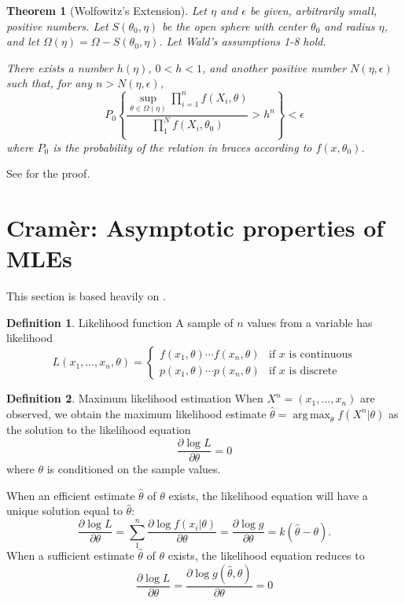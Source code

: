 \documentclass[letterpaper,11pt]{article}
\DeclareMathOperator*{\argmax}{arg\,max}
\newcounter{thm}
\newtheorem{theorem}[thm]{Theorem}
\theoremstyle{definition}
\newcounter{def}
\newtheorem*{defn}{Definition}
\begin{document}
\begin{theorem}[Wolfowitz's Extension]\label{wolf-thm}
Let $\eta$ and $\epsilon$ be given, arbitrarily small, positive numbers. Let $S(\theta_0,\eta)$ be the open sphere with center $\theta_0$ and radius $\eta$, and let $\Omega(\eta) = \Omega - S(\theta_0,\eta)$. Let Wald's assumptions 1-8 hold. 

There exists a number $h(\eta)$, $0<h<1$, and another positive number $N(\eta,\epsilon)$ such that, for any $n>N(\eta,\epsilon)$, $$P_0\left\{
\frac{\sup_{\theta\in\Omega(\eta)}\prod_{i=1}^n f(X_i,\theta)}
{\prod_{1}^N f(X_i,\theta_0)} > h^n
\right\}<\epsilon$$
where $P_0$ is the probability of the relation in braces according to $f(x,\theta_0)$.
\end{theorem}

See \citet{wolfowitzWaldProofConsistency1949} for the proof.

\section{Cram\`er: Asymptotic properties of MLEs}
This section is based heavily on \citet{cramerMathematicalMethodsStatistics1946}.

\begin{defn}{Likelihood function} A sample of $n$ values from a variable has likelihood $$L(x_1, ..., x_n,\theta) = \left\{\begin{array}{ll}f(x_1,\theta)\cdots f(x_n,\theta) & \text{if }x\text{ is continuous}\\ p(x_1,\theta)\cdots p(x_n,\theta) & \text{if }x\text{ is discrete}\end{array}\right.$$
\end{defn}

\begin{defn}{Maximum likelihood estimation}
When $X^n = (x_1, ..., x_n)$ are observed, we obtain the maximum likelihood estimate $\hat\theta = \argmax_\theta f(X^n|\theta)$ as the solution to the likelihood equation $$\frac{\partial \log L}{\partial\theta} = 0$$ where $\theta$ is conditioned on the sample values.
\end{defn}

When an efficient estimate $\hat\theta$ of $\theta$ exists, the likelihood equation will have a unique solution equal to $\hat\theta$: $$\frac{\partial \log L}{\partial \theta}=\sum_{1}^n \frac{\partial\log f(x_i|\theta)}{\partial\theta} = \frac{\partial \log g}{\partial\theta} = k(\hat\theta-\theta).$$ 
When a sufficient estimate $\hat\theta$ of $\theta$ exists, the likelihood equation reduces to $$\frac{\partial\log L}{\partial\theta} = \frac{\partial\log g(\hat\theta,\theta)}{\partial\theta} = 0$$
\end{document}
